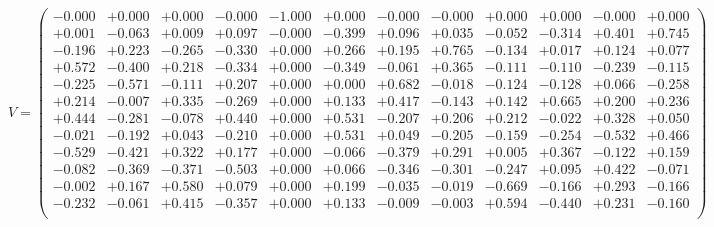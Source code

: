 \documentclass[9pt]{article}
\theoremstyle{plain}
\theoremstyle{definition}
\theoremstyle{remark}
\numberwithin{equation}{section}
\begin{document}
$V = \left(
\begin{array}{
cccccccccccc}
-0.000 & +0.000 & +0.000 & -0.000 & -1.000 & +0.000 & -0.000 & -0.000 & +0.000 & +0.000 & -0.000 & +0.000 \\
+0.001 & -0.063 & +0.009 & +0.097 & -0.000 & -0.399 & +0.096 & +0.035 & -0.052 & -0.314 & +0.401 & +0.745 \\
-0.196 & +0.223 & -0.265 & -0.330 & +0.000 & +0.266 & +0.195 & +0.765 & -0.134 & +0.017 & +0.124 & +0.077 \\
+0.572 & -0.400 & +0.218 & -0.334 & +0.000 & -0.349 & -0.061 & +0.365 & -0.111 & -0.110 & -0.239 & -0.115 \\
-0.225 & -0.571 & -0.111 & +0.207 & +0.000 & +0.000 & +0.682 & -0.018 & -0.124 & -0.128 & +0.066 & -0.258 \\
+0.214 & -0.007 & +0.335 & -0.269 & +0.000 & +0.133 & +0.417 & -0.143 & +0.142 & +0.665 & +0.200 & +0.236 \\
+0.444 & -0.281 & -0.078 & +0.440 & +0.000 & +0.531 & -0.207 & +0.206 & +0.212 & -0.022 & +0.328 & +0.050 \\
-0.021 & -0.192 & +0.043 & -0.210 & +0.000 & +0.531 & +0.049 & -0.205 & -0.159 & -0.254 & -0.532 & +0.466 \\
-0.529 & -0.421 & +0.322 & +0.177 & +0.000 & -0.066 & -0.379 & +0.291 & +0.005 & +0.367 & -0.122 & +0.159 \\
-0.082 & -0.369 & -0.371 & -0.503 & +0.000 & +0.066 & -0.346 & -0.301 & -0.247 & +0.095 & +0.422 & -0.071 \\
-0.002 & +0.167 & +0.580 & +0.079 & +0.000 & +0.199 & -0.035 & -0.019 & -0.669 & -0.166 & +0.293 & -0.166 \\
-0.232 & -0.061 & +0.415 & -0.357 & +0.000 & +0.133 & -0.009 & -0.003 & +0.594 & -0.440 & +0.231 & -0.160 \\
\end{array}
\right)$ \newline 
\end{document}
